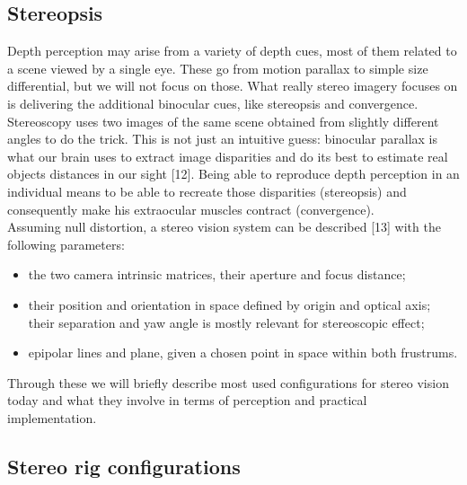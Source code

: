 \subsection{Stereopsis}
Depth perception may arise from a variety of depth cues, most of them related to a scene viewed by a single eye. These go from motion parallax to simple size differential, but we will not focus on those. What really stereo imagery focuses on is delivering the additional binocular cues, like stereopsis and convergence. Stereoscopy uses two images of the same scene obtained from slightly different angles to do the trick. This is not just an intuitive guess: binocular parallax is what our brain uses to extract image disparities and do its best to estimate real objects distances in our sight [12]. Being able to reproduce depth perception in an individual means to be able to recreate those disparities (stereopsis) and consequently make his extraocular muscles contract (convergence).\\
Assuming null distortion, a stereo vision system can be described [13] with the following parameters:
\begin{itemize}
\item the two camera intrinsic matrices, their aperture and focus distance;
\item their position and orientation in space defined by origin and optical axis; their separation and yaw angle is mostly relevant for stereoscopic effect;
\item epipolar lines and plane, given a chosen point in space within both frustrums.
\end{itemize}
Through these we will briefly describe most used configurations for stereo vision today and what they involve in terms of perception and practical implementation.

\subsection{Stereo rig configurations}

